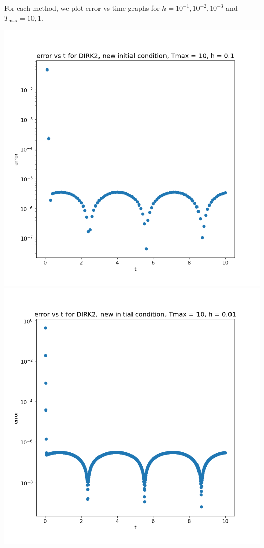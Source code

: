 \documentclass{article}
\begin{document}
\begin{enumerate}[label=(\alph*)]
For each method, we plot error vs time graphs for $h=10^{-1},10^{-2},10^{-3}$ and $T_\text{max}=10,1$.

\begin{center}
	\includegraphics[scale=.3]{hw3 dirk2 err vs t graph 1}
	\includegraphics[scale=.3]{hw3 dirk2 err vs t graph 2}

\end{center}
\end{enumerate}
\end{document}
